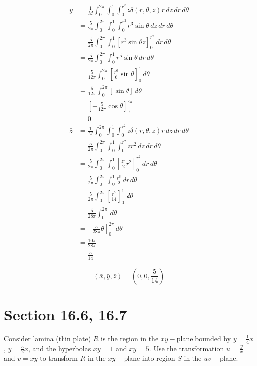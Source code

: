 \documentclass[letter,11pt]{article}
\begin{document}
\begin{align*}
\bar{y} &= \frac{1}{M}\int_{0}^{2\pi}\int_{0}^{1}\int_{0}^{r^{2}} z\delta(r, \theta, z) r \, dz\, dr\, d\theta \\
        &= \frac{5}{2\pi}\int_{0}^{2\pi}\int_{0}^{1}\int_{0}^{r^{2}} r^3\sin\theta \, dz\, dr\, d\theta \\
        &= \frac{5}{2\pi}\int_{0}^{2\pi}\int_{0}^{1} \left[r^3\sin\theta z\right]_{0}^{r^{2}} \, dr\, d\theta \\
        &= \frac{5}{2\pi}\int_{0}^{2\pi}\int_{0}^{1} r^5\sin\theta \, dr\, d\theta \\
        &= \frac{5}{12\pi}\int_{0}^{2\pi} \left[\frac{r^6}{6}\sin\theta \right]_{0}^{1}\, d\theta \\
        &= \frac{5}{12\pi}\int_{0}^{2\pi} \left[\sin\theta \right]\, d\theta \\
        &= \left[-\frac{5}{12\pi}\cos\theta \right]_{0}^{2\pi} \\
        &= 0 
\end{align*}
\begin{align*}
\bar{z} &= \frac{1}{M}\int_{0}^{2\pi}\int_{0}^{1}\int_{0}^{r^{2}} z\delta(r, \theta, z) r \, dz\, dr\, d\theta \\
        &= \frac{5}{2\pi}\int_{0}^{2\pi}\int_{0}^{1}\int_{0}^{r^{2}} zr^2 \, dz\, dr\, d\theta \\
        &= \frac{5}{2\pi}\int_{0}^{2\pi}\int_{0}^{1} \left[\frac{z^2}{2}r^{2}\right]_{0}^{r^{2}} \, dr\, d\theta \\
        &= \frac{5}{2\pi}\int_{0}^{2\pi}\int_{0}^{1} \frac{r^6}{2} \, dr\, d\theta\\
        &= \frac{5}{2\pi}\int_{0}^{2\pi}\left[ \frac{r^7}{14} \right]_{0}^{1}\, \, d\theta\\
         &= \frac{5}{28\pi}\int_{0}^{2\pi} \, d\theta\\
         &= \left[\frac{5}{28\pi}\theta\right]_{0}^{2\pi} \, d\theta\\
         &=\frac{10\pi}{28\pi}\\
         &= \frac{5}{14}
\end{align*}

$$\left(\bar{x}, \bar{y}, \bar{z}\right)= \boxed{\left(0, 0, \frac{5}{14}\right)}$$
\section*{Section 16.6, 16.7}
Consider lamina (thin plate) $R$ is the region in the $xy-$plane bounded by $y = \frac{1}{4}x$, $y = \frac{5}{2}x$, and the hyperbolas $xy = 1$ and $xy = 5$. Use the transformation $u = \frac{y}{x}$ and $v = xy$ to transform $R$ in the $xy-$plane into region $S$ in the $uv-$plane.
\end{document}
